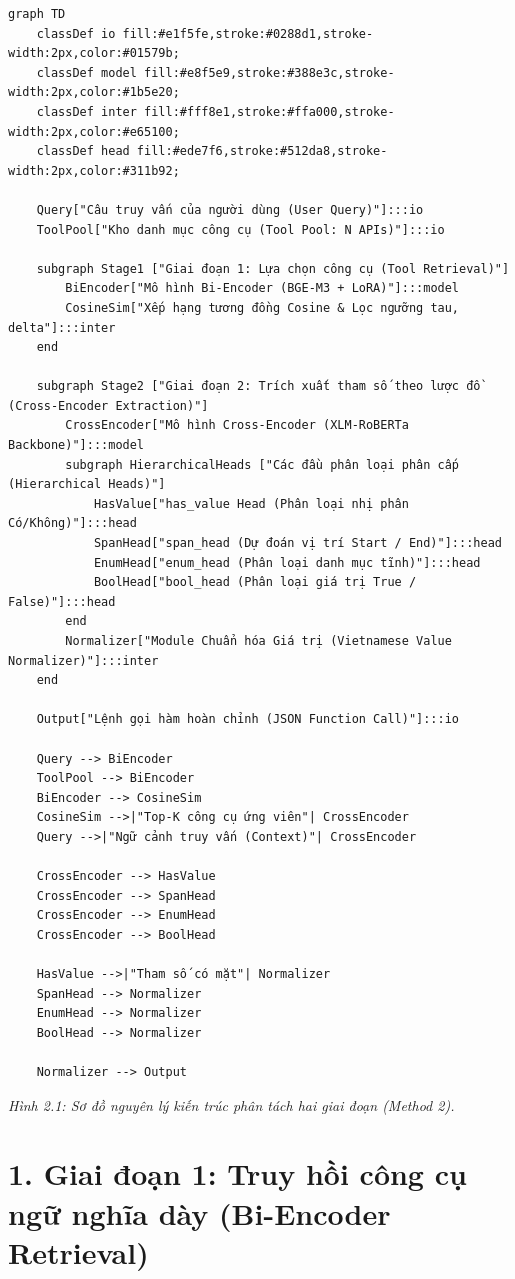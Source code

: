 \begin{verbatim}
graph TD
    classDef io fill:#e1f5fe,stroke:#0288d1,stroke-width:2px,color:#01579b;
    classDef model fill:#e8f5e9,stroke:#388e3c,stroke-width:2px,color:#1b5e20;
    classDef inter fill:#fff8e1,stroke:#ffa000,stroke-width:2px,color:#e65100;
    classDef head fill:#ede7f6,stroke:#512da8,stroke-width:2px,color:#311b92;

    Query["Câu truy vấn của người dùng (User Query)"]:::io
    ToolPool["Kho danh mục công cụ (Tool Pool: N APIs)"]:::io

    subgraph Stage1 ["Giai đoạn 1: Lựa chọn công cụ (Tool Retrieval)"]
        BiEncoder["Mô hình Bi-Encoder (BGE-M3 + LoRA)"]:::model
        CosineSim["Xếp hạng tương đồng Cosine & Lọc ngưỡng tau, delta"]:::inter
    end

    subgraph Stage2 ["Giai đoạn 2: Trích xuất tham số theo lược đồ (Cross-Encoder Extraction)"]
        CrossEncoder["Mô hình Cross-Encoder (XLM-RoBERTa Backbone)"]:::model
        subgraph HierarchicalHeads ["Các đầu phân loại phân cấp (Hierarchical Heads)"]
            HasValue["has_value Head (Phân loại nhị phân Có/Không)"]:::head
            SpanHead["span_head (Dự đoán vị trí Start / End)"]:::head
            EnumHead["enum_head (Phân loại danh mục tĩnh)"]:::head
            BoolHead["bool_head (Phân loại giá trị True / False)"]:::head
        end
        Normalizer["Module Chuẩn hóa Giá trị (Vietnamese Value Normalizer)"]:::inter
    end

    Output["Lệnh gọi hàm hoàn chỉnh (JSON Function Call)"]:::io

    Query --> BiEncoder
    ToolPool --> BiEncoder
    BiEncoder --> CosineSim
    CosineSim -->|"Top-K công cụ ứng viên"| CrossEncoder
    Query -->|"Ngữ cảnh truy vấn (Context)"| CrossEncoder

    CrossEncoder --> HasValue
    CrossEncoder --> SpanHead
    CrossEncoder --> EnumHead
    CrossEncoder --> BoolHead

    HasValue -->|"Tham số có mặt"| Normalizer
    SpanHead --> Normalizer
    EnumHead --> Normalizer
    BoolHead --> Normalizer

    Normalizer --> Output
\end{verbatim}

\textit{Hình 2.1: Sơ đồ nguyên lý kiến trúc phân tách hai giai đoạn (Method 2).}


\section{1. Giai đoạn 1: Truy hồi công cụ ngữ nghĩa dày (Bi-Encoder Retrieval)}

